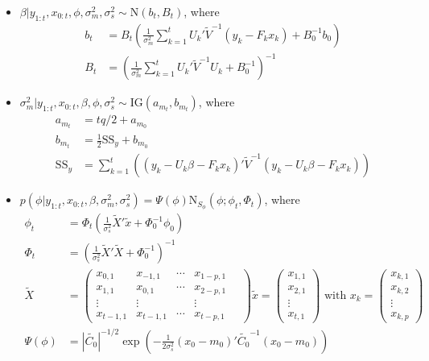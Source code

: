 \documentclass{article}
\begin{document}
\begin{itemize}
\item $\beta|y_{1:t},x_{0:t},\phi,\sigma^2_m,\sigma^2_s \sim \mbox{N}(b_t,B_t)$, where
\begin{align*}
b_t &= B_t\left(\frac{1}{\sigma^2_m} \sum^t_{k=1} U_k'\tilde{V}^{-1}(y_k - F_kx_k) + B_0^{-1}b_0\right) \\
B_t &= \left(\frac{1}{\sigma^2_m} \sum^t_{k=1} U_k'\tilde{V}^{-1}U_k + B_0^{-1}\right)^{-1}
\end{align*}
\item $\sigma^2_m|y_{1:t},x_{0:t},\beta,\phi,\sigma^2_s \sim \mbox{IG}(a_{m_t}, b_{m_t})$, where
\begin{align*}
a_{m_t} &= tq/2 + a_{m_0} \\
b_{m_t} &= \frac{1}{2}\mbox{SS}_y + b_{m_0} \\
\mbox{SS}_y &= \sum^t_{k=1} \left((y_k - U_k\beta - F_kx_k)'\tilde{V}^{-1}(y_k - U_k\beta - F_kx_k)\right)
\end{align*}
\item $p(\phi|y_{1:t},x_{0:t},\beta,\sigma^2_m,\sigma^2_s) = \Psi(\phi)\mbox{N}_{S_\phi}(\phi; \phi_t,\Phi_t)$, where
\begin{align*}
\phi_t &= \Phi_t\left(\frac{1}{\sigma^2_s} \tilde{X}'\tilde{x} + \Phi_0^{-1}\phi_0\right) \\
\Phi_t &= \left(\frac{1}{\sigma^2_s} \tilde{X}'\tilde{X} + \Phi_0^{-1}\right)^{-1} \\
\tilde{X} &= \left(\begin{array}{ccccc}
x_{0,1} & x_{-1,1} & \cdots & x_{1-p,1} \\
x_{1,1} & x_{0,1} & \cdots & x_{2-p,1} \\
\vdots & \vdots & & \vdots \\
x_{t-1,1} & x_{t-1,1} & \cdots & x_{t-p,1}
\end{array} \quad
\right) \tilde{x} = \left(\begin{array}{c} x_{1,1} \\ x_{2,1} \\ \vdots \\ x_{t,1} \end{array}\right)
\mbox{ with } x_k = \left(\begin{array}{c} x_{k,1} \\ x_{k,2} \\ \vdots \\ x_{k,p} \end{array}\right) \\
\Psi(\phi) &= \left|\tilde{C_0}\right|^{-1/2}\exp\left(-\frac{1}{2\sigma^2_s}(x_0-m_0)'\tilde{C_0}^{-1}(x_0-m_0)\right)

\end{align*}
\end{itemize}
\end{document}
